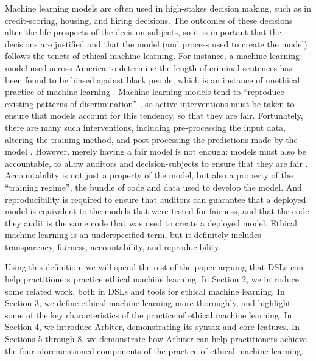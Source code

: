 \documentclass[sigconf]{acmart}
\begin{document}
Machine learning models are often used in high-stakes decision making, such as in credit-scoring, housing, and hiring decisions. The outcomes of these decisions alter the life prospects of the decision-subjects, so it is important that the decisions are justified and that the model (and process used to create the model) follows the tenets of ethical machine learning. For instance, a machine learning model used across America to determine the length of criminal sentences has been found to be biased against black people, which is an instance of unethical practice of machine learning \citep{Kirchner2016}. Machine learning models tend to ``reproduce existing patterns of discrimination'' \citep{Barocas2016}, so active interventions must be taken to ensure that models account for this tendency, so that they are fair. Fortunately, there are many such interventions, including pre-processing the input data, altering the training method, and post-processing the predictions made by the model \cite{Bellamy2018,Hajian2016}. However, merely having a fair model is not enough: models must also be accountable, to allow auditors and decision-subjects to ensure that they are fair \citep{Binns2018}. Accountability is not just a property of the model, but also a property of the ``training regime'', the bundle of code and data used to develop the model. And reproducibility is required to ensure that auditors can guarantee that a deployed model is equivalent to the models that were tested for fairness, and that the code they audit is the same code that was used to create a deployed model. Ethical machine learning is an underspecified term, but it definitely includes transparency, fairness, accountability, and reproducibility.

Using this definition, we will spend the rest of the paper arguing that DSLs can help practitioners practice ethical machine learning. In Section 2, we introduce some related work, both in DSLs and tools for ethical machine learning. In Section 3, we define ethical machine learning more thoroughly, and highlight some of the key characteristics of the practice of ethical machine learning. In Section 4, we introduce Arbiter, demonstrating its syntax and core features. In Sections 5 through 8, we demonstrate how Arbiter can help practitioners achieve the four aforementioned components of the practice of ethical machine learning.
\end{document}
